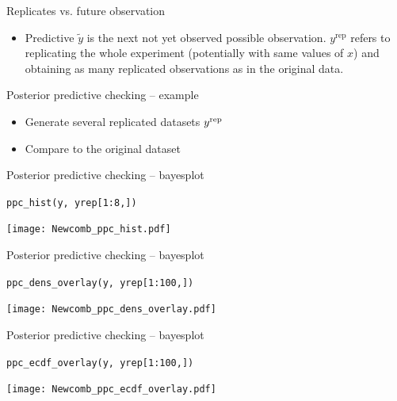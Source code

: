 \documentclass[t]{beamer}
\begin{document}
\begin{frame}{Replicates vs. future observation}

  \begin{itemize}
  \item Predictive $\tilde{y}$ is the next not yet observed possible
    observation. $y^{\mathrm{rep}}$ refers to replicating the whole
    experiment (potentially with same values of $x$) and obtaining as
    many replicated observations as in the original data.
  \end{itemize}

\end{frame}

\begin{frame}{Posterior predictive checking -- example}

  \begin{itemize}
  \item<1-> Generate several replicated datasets $y^{\rm rep}$
  \item<2-> Compare to the original dataset
  \end{itemize}
  \vspace{-1\baselineskip}

\end{frame}

\begin{frame}{Posterior predictive checking -- bayesplot}

  \vspace{-1\baselineskip}
  \texttt{ppc\_hist(y, yrep[1:8,])}
  
  \texttt{[image: Newcomb\_ppc\_hist.pdf]}

\end{frame}

\begin{frame}{Posterior predictive checking -- bayesplot}

  \vspace{-1\baselineskip}
  \texttt{ppc\_dens\_overlay(y, yrep[1:100,])}
  
  \texttt{[image: Newcomb\_ppc\_dens\_overlay.pdf]}

\end{frame}

\begin{frame}{Posterior predictive checking -- bayesplot}

  \vspace{-1\baselineskip}
  \texttt{ppc\_ecdf\_overlay(y, yrep[1:100,])}
  
  \texttt{[image: Newcomb\_ppc\_ecdf\_overlay.pdf]}

\end{frame}
\end{document}

